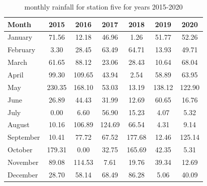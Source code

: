 \documentclass[12pt]{article}
\theoremstyle{definition}
\begin{document}
\begin{table}[ht]
  \centering
  \caption{monthly rainfall for station five for years 2015-2020}
  \label{tab:station5}
  \begin{tabular}{l *{6}{S[table-format=3.2]}}
    \toprule
    \textbf{Month} & \textbf{2015} & \textbf{2016} & \textbf{2017} & \textbf{2018} & \textbf{2019} & \textbf{2020} \\
    \midrule
    January  & 71.56 & 12.18 & 46.96 &  1.26 & 51.77 & 52.26 \\
    February &  3.30 & 28.45 & 63.49 & 64.71 & 13.93 & 49.71 \\
    March    & 61.65 & 88.12 & 23.06 & 28.43 & 10.64 & 68.04 \\
    April    & 99.30 &109.65 & 43.94 &  2.54 & 58.89 & 63.95 \\
    May      &230.35 &168.10 & 53.03 & 13.19 &138.12 &122.90 \\
    June     & 26.89 & 44.43 & 31.99 & 12.69 & 60.65 & 16.76 \\
    July     &  0.00 &  6.60 & 56.90 & 15.23 &  4.07 &  5.32 \\
    August   & 10.16 &106.89 &124.69 & 66.54 &  4.31 &  9.14 \\
    September& 10.41 & 77.72 & 67.52 &177.68 & 12.46 &125.14 \\
    October  &179.31 &  0.00 & 32.75 &165.69 & 42.35 &  5.31 \\
    November & 89.08 &114.53 &  7.61 & 19.76 & 39.34 & 12.69 \\
    December & 28.70 & 58.14 & 68.49 & 86.28 &  5.06 & 40.09 \\
    \bottomrule
  \end{tabular}
\end{table}
\\
\end{document}
